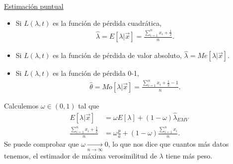 \underline{Estimación puntual}
\begin{itemize}
    \item Si $L(\lambda,t)$ es la función de pérdida cuadrática,
          \begin{align*}
              \widehat{\lambda} = E[\lambda |  \vec{x}] = \frac{\sum_{i=1}^{n} x_i + \frac{1}{2}}{n}.
          \end{align*}
    \item Si $L(\lambda,t)$ es la función de pérdida de valor absoluto, $\widehat{\lambda} = Me[\lambda | \vec{x}]$.
    \item Si $L(\lambda,t)$ es la función de pérdida 0-1,
          \begin{align*}
              \widehat{\theta} = Mo[\lambda | \vec{x}] = \frac{\sum_{i=1}^{n} x_i + \frac{1}{2} - 1}{n}.
          \end{align*}
\end{itemize}
Calculemos $\omega \in (0,1)$ tal que
\begin{align*}
    E[\lambda  | \vec{x}]                      & = \omega E[\lambda]  + (1 - \omega) \widehat{\lambda }_{EMV}    \\
    \frac{\sum_{i=1}^{n} x_i + \frac{1}{2}}{n} & = \omega \frac{p}{a} + (1-\omega) \frac{\sum_{i=1}^{n} x_i}{n}.
\end{align*}
Se puede comprobar que $\omega \xrightarrow[n \to \infty]{} 0$, lo que nos dice que cuantos más datos tenemos, el estimador de máxima verosimilitud de $\lambda$ tiene más peso.

